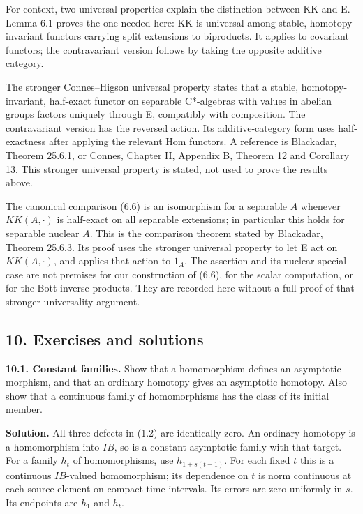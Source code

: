 \documentclass[
  11pt,
]{article}
\begin{document}
For context, two universal properties explain the distinction between KK
and E. Lemma 6.1 proves the one needed here: KK is universal among
stable, homotopy-invariant functors carrying split extensions to
biproducts. It applies to covariant functors; the contravariant version
follows by taking the opposite additive category.

The stronger Connes--Higson universal property states that a stable,
homotopy-invariant, half-exact functor on separable C*-algebras with
values in abelian groups factors uniquely through E, compatibly with
composition. The contravariant version has the reversed action. Its
additive-category form uses half-exactness after applying the relevant
Hom functors. A reference is Blackadar, Theorem 25.6.1, or Connes,
Chapter II, Appendix B, Theorem 12 and Corollary 13. This stronger
universal property is stated, not used to prove the results above.

The canonical comparison (6.6) is an isomorphism for a separable \(A\)
whenever \(KK(A,\cdot)\) is half-exact on all separable extensions; in
particular this holds for separable nuclear \(A\). This is the
comparison theorem stated by Blackadar, Theorem 25.6.3. Its proof uses
the stronger universal property to let E act on \(KK(A,\cdot)\), and
applies that action to \(1_A\). The assertion and its nuclear special
case are not premises for our construction of (6.6), for the scalar
computation, or for the Bott inverse products. They are recorded here
without a full proof of that stronger universality argument.

\subsection{10. Exercises and solutions}\label{exercises-and-solutions}

\textbf{10.1. Constant families.} Show that a homomorphism defines an
asymptotic morphism, and that an ordinary homotopy gives an asymptotic
homotopy. Also show that a continuous family of homomorphisms has the
class of its initial member.

\textbf{Solution.} All three defects in (1.2) are identically zero. An
ordinary homotopy is a homomorphism into \(IB\), so is a constant
asymptotic family with that target. For a family \(h_t\) of
homomorphisms, use \(h_{1+s(t-1)}\). For each fixed \(t\) this is a
continuous \(IB\)-valued homomorphism; its dependence on \(t\) is norm
continuous at each source element on compact time intervals. Its errors
are zero uniformly in \(s\). Its endpoints are \(h_1\) and \(h_t\).
\end{document}

